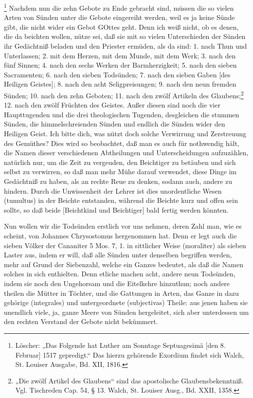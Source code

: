 \footnote{Löscher: „Das Folgende hat Luther am Sonntage Septuagesimä [den 8. Februar] 1517 gepredigt.“ Das hierzu gehörende Exordium findet sich Walch, St. Louiser Ausgabe, Bd. XII, 1816.} Nachdem nun die zehn Gebote zu Ende gebracht sind, müssen die so vielen Arten von Sünden unter die Gebote eingereiht werden, weil es ja keine Sünde gibt, die nicht wider ein Gebot GOttes geht. Denn ich weiß nicht, ob es denen, die da beichten wollen, nütze sei, daß sie mit so vielen Unterschieden der Sünden ihr Gedächtniß beladen und den Priester ermüden, als da sind: 1. nach Thun und Unterlassen; 2. mit dem Herzen, mit dem Munde, mit dem Werk; 3. nach den fünf Sinnen; 4. nach den sechs Werken der Barmherzigkeit; 5. nach den sieben Sacramenten; 6. nach den sieben Todsünden; 7. nach den sieben Gaben [des Heiligen Geistes]; 8. nach den acht Seligpreisungen; 9. nach den neun fremden Sünden; 10. nach den zehn Geboten; 11. nach den zwölf Artikeln des Glaubens;\footnote{„Die zwölf Artikel des Glaubens“ sind das apostolische Glaubensbekenntniß. Vgl. Tischreden Cap. 54, § 13. Walch, St. Louiser Ausg., Bd. XXII, 1358.} 12. nach den zwölf Früchten des Geistes. Außer diesen sind noch die vier Haupttugenden und die drei theologischen Tugenden, desgleichen die stummen Sünden, die himmelschreienden Sünden und endlich die Sünden wider den Heiligen Geist. Ich bitte dich, was nützt doch solche Verwirrung und Zerstreuung des Gemüthes? Dies wird so beobachtet, daß man es auch für nothwendig hält, die Namen dieser verschiedenen Abtheilungen und Unterscheidungen aufzuzählen, natürlich nur, um die Zeit zu vergeuden, den Beichtiger zu betäuben und sich selbst zu verwirren, so daß man mehr Mühe darauf verwendet, diese Dinge im Gedächtniß zu haben, als an rechte Reue zu denken, sodann auch, andere zu hindern. Durch die Unwissenheit der Lehrer ist dies unordentliche Wesen (tumultus) in der Beichte entstanden, während die Beichte kurz und offen sein sollte, so daß beide [Beichtkind und Beichtiger] bald fertig werden könnten.

Nun wollen wir die Todsünden erstlich vor uns nehmen, deren Zahl man, wie es scheint, von Johannes Chrysostomus hergenommen hat. Denn er legt auch die sieben Völker der Cananiter 5 Mos. 7, 1. in sittlicher Weise (moraliter) als sieben Laster aus, indem er will, daß alle Sünden unter denselben begriffen werden, mehr auf Grund der Siebenzahl, welche ein Ganzes bedeutet, als daß die Namen solches in sich enthielten. Denn etliche machen acht, andere neun Todsünden, indem sie noch den Ungehorsam und die Eitelkehre hinzuthun; noch andere theilen die Mütter in Töchter, und die Gattungen in Arten, das Ganze in dazu gehörige (integrales) und untergeordnete (subjectivas) Theile: aus jenen haben sie unendlich viele, ja, ganze Meere von Sünden hergeleitet, sich aber unterdessen um den rechten Verstand der Gebote nicht bekümmert.

